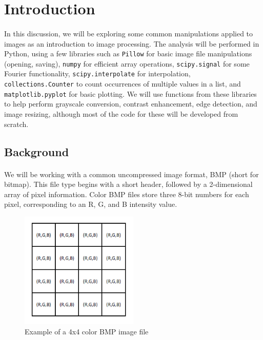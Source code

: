 \documentclass[11pt,a4paper]{article}
\begin{document}
\pagebreak

\tableofcontents

\pagebreak

\section{Introduction}
\paragraph*{} In this discussion, we will be exploring some common manipulations applied to images as an introduction to image processing. The analysis will be performed in Python, using a few libraries such as \verb|Pillow| for basic image file manipulations (opening, saving), \verb|numpy| for efficient array operations, \verb|scipy.signal| for some Fourier functionality, \verb|scipy.interpolate| for interpolation, \\ \verb|collections.Counter| to count occurrences of multiple values in a list, and \verb|matplotlib.pyplot| for basic plotting. We will use functions from these libraries to help perform grayscale conversion, contrast enhancement, edge detection, and image resizing, although most of the code for these will be developed from scratch.


\subsection{Background}
\paragraph*{} We will be working with a common uncompressed image format, BMP (short for bitmap). This file type begins with a short header, followed by a 2-dimensional array of pixel information. Color BMP files store three 8-bit numbers for each pixel, corresponding to an R, G, and B intensity value.

\begin{figure}
	\centering
	\includegraphics[width=0.5\textwidth]{figs/rgb_example}
	\caption{Example of a 4x4 color BMP image file}
	\label{fig:rgb_example}
\end{figure}
\end{document}
